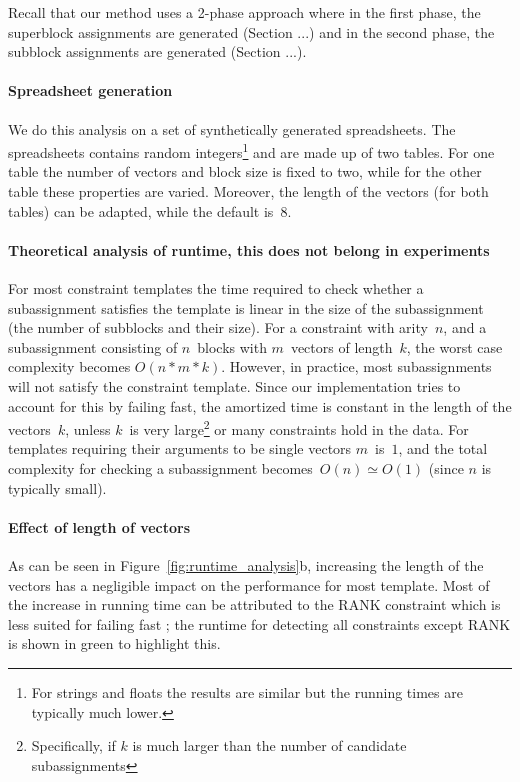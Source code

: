 Recall that our method uses a 2-phase approach where in the first phase, the superblock assignments are generated (Section ...) and in the second phase, the subblock assignments are generated (Section ...).

\paragraph{Spreadsheet generation}
We do this analysis on a set of synthetically generated spreadsheets.
The spreadsheets contains random integers\footnote{For strings and floats the results are similar but the running times are typically much lower.} and are made up of two tables.
For one table the number of vectors and block size is fixed to two, while for the other table these properties are varied.
Moreover, the length of the vectors (for both tables) can be adapted, while the default is~$8$.

\paragraph{Theoretical analysis of runtime, this does not belong in experiments}
For most constraint templates the time required to check whether a subassignment satisfies the template is linear in the size of the subassignment (the number of subblocks and their size).
For a constraint with arity~$n$, and a subassignment consisting of $n$~blocks with $m$~vectors of length~$k$, the worst case complexity becomes $O(n * m * k)$.
However, in practice, most subassignments will not satisfy the constraint template.
Since our implementation tries to account for this by failing fast, the amortized time is constant in the length of the vectors~$k$, unless $k$~is very large\footnote{Specifically, if $k$ is much larger than the number of candidate subassignments} or many constraints hold in the data.
For templates requiring their arguments to be single vectors $m$~is~$1$, and the total complexity for checking a subassignment becomes~$O(n) \simeq O(1)$ (since $n$ is typically small).

\paragraph{Effect of length of vectors}
As can be seen in Figure~\ref{fig:runtime_analysis}b, increasing the length of the vectors has a negligible impact on the performance for most template. Most of the increase in running time can be attributed to the RANK constraint which is less suited for failing fast ; the runtime for detecting all constraints except RANK is shown in green to highlight this.

